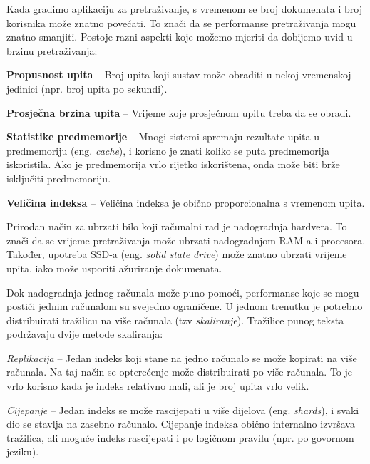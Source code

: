 \documentclass[a4paper,twoside,12pt]{scrreprt}
\begin{document}
Kada gradimo aplikaciju za pretraživanje, s vremenom se broj dokumenata i broj korisnika može znatno povećati. To znači da se performanse pretraživanja mogu znatno smanjiti. Postoje razni aspekti koje možemo mjeriti da dobijemo uvid u brzinu pretraživanja:

\begin{compactitem}
  \item \textbf{Propusnost upita} – Broj upita koji sustav može obraditi u nekoj vremenskoj jedinici (npr. broj upita po sekundi).
  \item \textbf{Prosječna brzina upita} – Vrijeme koje prosječnom upitu treba da se obradi.
  \item \textbf{Statistike predmemorije} – Mnogi sistemi spremaju rezultate upita u predmemoriju (eng. \textit{cache}), i korisno je znati koliko se puta predmemorija iskoristila. Ako je predmemorija vrlo rijetko iskorištena, onda može biti brže isključiti predmemoriju.
  \item \textbf{Veličina indeksa} – Veličina indeksa je obično proporcionalna s vremenom upita.
\end{compactitem}

Prirodan način za ubrzati bilo koji računalni rad je nadogradnja hardvera. To znači da se vrijeme pretraživanja može ubrzati nadogradnjom RAM-a i procesora. Također, upotreba SSD-a (eng. \textit{solid state drive}) može znatno ubrzati vrijeme upita, iako može usporiti ažuriranje dokumenata.

Dok nadogradnja jednog računala može puno pomoći, performanse koje se mogu postići jednim računalom su svejedno ograničene. U jednom trenutku je potrebno distribuirati tražilicu na više računala (tzv \textit{skaliranje}). Tražilice punog teksta podržavaju dvije metode skaliranja:

\begin{compactenum}
  \item \textit{Replikacija} – Jedan indeks koji stane na jedno računalo se može kopirati na više računala. Na taj način se opterećenje može distribuirati po više računala. To je vrlo korisno kada je indeks relativno mali, ali je broj upita vrlo velik.
  \item \textit{Cijepanje} – Jedan indeks se može rascijepati u više dijelova (eng. \textit{shards}), i svaki dio se stavlja na zasebno računalo. Cijepanje indeksa obično internalno izvršava tražilica, ali moguće indeks rascijepati i po logičnom pravilu (npr. po govornom jeziku).
\end{compactenum}
\end{document}
